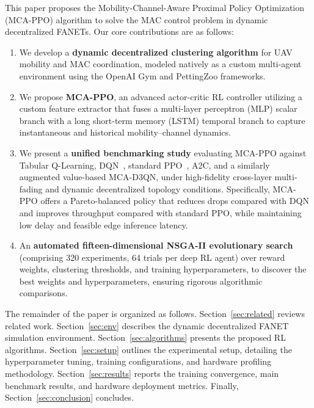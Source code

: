 This paper proposes the Mobility-Channel-Aware Proximal Policy Optimization (MCA-PPO) algorithm to solve the MAC control problem in dynamic decentralized FANETs. Our core contributions are as follows:
\begin{enumerate}
    \item We develop a \textbf{dynamic decentralized clustering algorithm} for UAV mobility and MAC coordination, modeled natively as a custom multi-agent environment using the OpenAI Gym and PettingZoo frameworks.
    \item We propose \textbf{MCA-PPO}, an advanced actor-critic RL controller utilizing a custom feature extractor that fuses a multi-layer perceptron (MLP) scalar branch with a long short-term memory (LSTM) temporal branch to capture instantaneous and historical mobility--channel dynamics.
    \item We present a \textbf{unified benchmarking study} evaluating MCA-PPO against Tabular Q-Learning, DQN~\cite{mnih2015dqn}, standard PPO~\cite{schulman2017ppo}, A2C, and a similarly augmented value-based MCA-D3QN, under high-fidelity cross-layer multi-fading and dynamic decentralized topology conditions. Specifically, MCA-PPO offers a Pareto-balanced policy that reduces drops compared with DQN and improves throughput compared with standard PPO, while maintaining low delay and feasible edge inference latency.
    \item An \textbf{automated fifteen-dimensional NSGA-II evolutionary search} (comprising 320 experiments, 64 trials per deep RL agent) over reward weights, clustering thresholds, and training hyperparameters, to discover the best weights and hyperparameters, ensuring rigorous algorithmic comparisons.
\end{enumerate}

The remainder of the paper is organized as follows. Section~\ref{sec:related} reviews related work. Section~\ref{sec:env} describes the dynamic decentralized FANET simulation environment. Section~\ref{sec:algorithms} presents the proposed RL algorithms. Section~\ref{sec:setup} outlines the experimental setup, detailing the hyperparameter tuning, training configurations, and hardware profiling methodology. Section~\ref{sec:results} reports the training convergence, main benchmark results, and hardware deployment metrics. Finally, Section~\ref{sec:conclusion} concludes.

